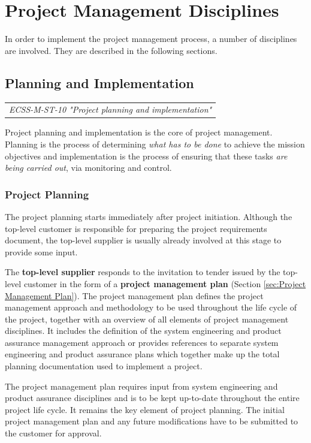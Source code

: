 \section{Project Management Disciplines}

In order to implement the project management process, a number of disciplines are involved. They are described in the following sections.

\subsection{Planning and Implementation}

\begin{tabular}{l}
\textit{ECSS-M-ST-10 "Project planning and implementation" \cite{ECSS-M-ST-10}}
\end{tabular}

Project planning and implementation is the core of project management. Planning is the process of determining \emph{what has to be done} to achieve the mission objectives and implementation is the process of ensuring that these tasks \emph{are being carried out}, via monitoring and control.

\subsubsection{Project Planning}

The project planning starts immediately after project initiation. Although the top-level customer is responsible for preparing the project requirements document, the top-level supplier is usually already involved at this stage to provide some input.

The \textbf{top-level supplier} responds to the invitation to tender issued by the top-level customer in the form of a \textbf{project management plan} (Section \ref{sec:Project Management Plan}). The project management plan defines the project management approach and methodology to be used throughout the life cycle of the project, together with an overview of all elements of project management disciplines. It includes the definition of the system engineering and product assurance management approach or provides references to separate system engineering and product assurance plans which together make up the total planning documentation used to implement a project.

The project management plan requires input from system engineering and product assurance disciplines and is to be kept up-to-date throughout the entire project life cycle. It remains the key element of project planning. The initial project management plan and any future modifications have to be submitted to the customer for approval.

